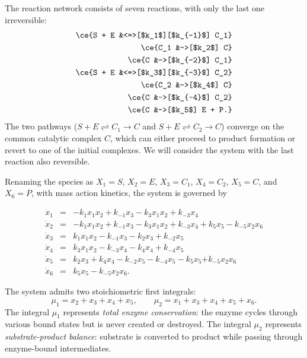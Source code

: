 \documentclass{article}
\begin{document}
The reaction network consists of seven reactions, with only the last one irreversible:
\begin{align}
\ce{S + E &<=>[$k_1$][$k_{-1}$] C_1} \label{enz:reac1}\\
\ce{C_1 &->[$k_2$] C} \label{enz:reac2}\\
\ce{C &->[$k_{-2}$] C_1} \label{enz:reac2rev}\\
\ce{S + E &<=>[$k_3$][$k_{-3}$] C_2} \label{enz:reac3}\\
\ce{C_2 &->[$k_4$] C} \label{enz:reac4}\\
\ce{C &->[$k_{-4}$] C_2} \label{enz:reac4rev}\\
\ce{C &->[$k_5$] E + P.} \label{enz:reac5}
\end{align}
The two pathways ($S + E \rightleftharpoons C_1 \to C$ and 
$S + E \rightleftharpoons C_2 \to C$) converge on the common 
catalytic complex $C$, which can either proceed to product formation 
or revert to one of the initial complexes.
We will consider the system with the last reaction also reversible.

Renaming the species as $X_1 = S$, $X_2 = E$, $X_3 = C_1$, 
$X_4 = C_2$, $X_5 = C$, and $X_6 = P$, with mass action kinetics, the system is governed by


\begin{equation}\label{enzymeODErev}
\begin{array}{rcl}
\dot x_1 &=& -k_1 x_1x_2 + k_{-1} x_3 - k_3 x_1x_2 + k_{-3} x_4 \\[3pt]
\dot x_2 &=& -k_1 x_1x_2 + k_{-1} x_3 - k_3 x_1x_2 + k_{-3} x_4 + k_5 x_5 -k_{-5}x_2x_6\\[3pt]
\dot x_3 &=& k_1 x_1x_2 - k_{-1} x_3 - k_2 x_3 + k_{-2} x_5 \\[3pt]
\dot x_4 &=& k_3 x_1x_2 - k_{-3} x_4 - k_4 x_4 + k_{-4} x_5 \\[3pt]
\dot x_5 &=& k_2 x_3 + k_4 x_4 - k_{-2} x_5 - k_{-4} x_5 - k_5 x_5 {+k_{-5}x_2x_6}\\[3pt]
\dot x_6 &=& k_5 x_5 -k_{-5}x_2x_6.
\end{array}
\end{equation}

The system admits two stoichiometric first integrals:
\begin{equation}\label{enz:stoich}
\mu_1 = x_2+x_3+x_4+x_5, \qquad \mu_2 = x_1+x_3+x_4+x_5+x_6.
\end{equation}
The integral $\mu_1$ represents \emph{total enzyme conservation}: 
the enzyme cycles through various bound states but is never created or 
destroyed. The integral $\mu_2$ represents \emph{substrate-product 
balance}: substrate is converted to product while passing through 
enzyme-bound intermediates.
\end{document}
